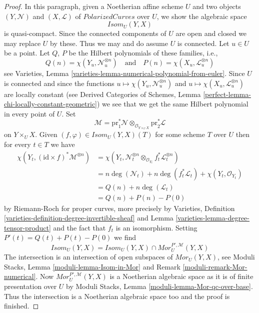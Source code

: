 \begin{proof}
\medskip\noindent
In this paragraph, given a Noetherian affine scheme $U$ and two objects
$(Y, \mathcal{N})$ and $(X, \mathcal{L})$
of $\textit{PolarizedCurves}$ over $U$, we show the algebraic space
$$
\mathit{Isom}_U(Y, X)
$$
is quasi-compact. Since the connected components of $U$ are open and closed
we may replace $U$ by these. Thus we may and do assume $U$ is connected.
Let $u \in U$ be a point. Let $Q$, $P$ be the Hilbert polynomials
of these families, i.e.,
$$
Q(n) = \chi(Y_u, \mathcal{N}_u^{\otimes n})
\quad\text{and}\quad
P(n) = \chi(X_u, \mathcal{L}_u^{\otimes n})
$$
see Varieties, Lemma \ref{varieties-lemma-numerical-polynomial-from-euler}.
Since $U$ is connected and since
the functions
$u \mapsto \chi(Y_u, \mathcal{N}_u^{\otimes n})$ and
$u \mapsto \chi(X_u, \mathcal{L}_u^{\otimes n})$
are locally constant (see 
Derived Categories of Schemes, Lemma
\ref{perfect-lemma-chi-locally-constant-geometric})
we see that we get the same Hilbert polynomial in every point of $U$.
Set
$$
\mathcal{M} = \text{pr}_1^*\mathcal{N}
\otimes_{\mathcal{O}_{Y \times_U X}} \text{pr}_2^*\mathcal{L}
$$
on $Y \times_U X$. Given $(f, \varphi) \in \mathit{Isom}_U(Y, X)(T)$
for some scheme $T$ over $U$ then for every $t \in T$ we have
\begin{align*}
\chi(Y_t, (\text{id} \times f)^*\mathcal{M}^{\otimes n})
& =
\chi(Y_t,
\mathcal{N}_t^{\otimes n} \otimes_{\mathcal{O}_{Y_t}}
f_t^*\mathcal{L}_t^{\otimes n}) \\
& =
n\deg(\mathcal{N}_t) + n\deg(f_t^*\mathcal{L}_t) +
\chi(Y_t, \mathcal{O}_{Y_t}) \\
& =
Q(n) + n\deg(\mathcal{L}_t) \\
& =
Q(n) + P(n) - P(0)
\end{align*}
by Riemann-Roch for proper curves, more precisely by
Varieties, Definition \ref{varieties-definition-degree-invertible-sheaf} and
Lemma \ref{varieties-lemma-degree-tensor-product}
and the fact that $f_t$ is an isomorphism.
Setting $P'(t) = Q(t) + P(t) - P(0)$ we find
$$
\mathit{Isom}_U(Y, X) =
\mathit{Isom}_U(Y, X) \cap \mathit{Mor}^{P', \mathcal{M}}_U(Y, X)
$$
The intersection is an intersection of open subspaces of
$\mathit{Mor}_U(Y, X)$, see
Moduli Stacks, Lemma \ref{moduli-lemma-Isom-in-Mor} and
Remark \ref{moduli-remark-Mor-numerical}.
Now $\mathit{Mor}^{P', \mathcal{M}}_U(Y, X)$
is a Noetherian algebraic space as it is of finite
presentation over $U$ by
Moduli Stacks, Lemma \ref{moduli-lemma-Mor-qc-over-base}.
Thus the intersection is a Noetherian algebraic space too
and the proof is finished.
\end{proof}

